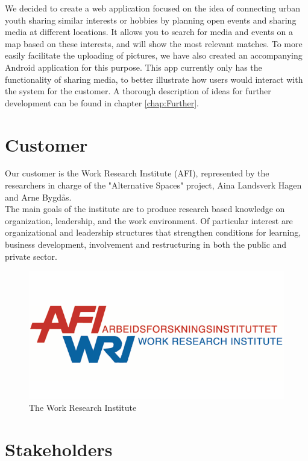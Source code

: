 We decided to create a web application focused on the idea of connecting urban youth sharing similar interests or hobbies by planning open events and sharing media at different locations. It allows you to search for media and events on a map based on these interests, and will show the most relevant matches. To more easily facilitate the uploading of pictures, we have also created an accompanying Android application for this purpose. This app currently only has the functionality of sharing media, to better illustrate how users would interact with the system for the customer. A thorough description of ideas for further development can be found in chapter \ref{chap:Further}.


\section{Customer}
\label{sec:IntroCustomer}

Our customer is the Work Research Institute (AFI), represented by the researchers in charge of the "Alternative Spaces" project, Aina Landsverk Hagen and Arne Bygd\aa s. \\
The main goals of the institute are to produce research based knowledge on organization, leadership, and the work environment. Of particular interest are organizational and leadership structures that strengthen conditions for learning, business development, involvement and restructuring in both the public and private sector. \\
%
\begin{figure}[ht!]
\centering
\includegraphics[width=\linewidth]{./Introduction/img/afi}
\caption{The Work Research Institute \label{fig:IntroAfi}}
\end{figure}

\section{Stakeholders}
\label{sec:IntroStakeholders}

